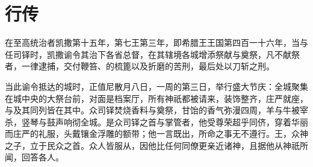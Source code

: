 
\chapter{行传}


\par

在至高统治者凯撒第十五年，第七王第三年，即希腊王王国第四百一十六年，当与任司铎时，凯撒谕令其治下各省总督，在其辖境各城增添祭献与奠祭，凡不献祭者，一律逮捕，交付鞭笞、的梳篦以及折磨的苦刑，最后处以刀斩之刑。\par

当此谕令抵达的城时，正值尼散月八日，一周的第三日，举行盛大节庆：全城聚集在城中央的大祭台前，对面是档案厅，所有神祇都被请来，装饰整齐，庄严就座，与及其同列皆在其中。众司铎焚烧香料与奠祭，甘饴的香气弥漫四周，羊与牛被宰杀，竖琴与鼓声响彻全城。是众司铎之首与掌管者，他受尊荣超乎同侪，穿着华丽而庄严的礼服，头戴镶金浮雕的额带；他一言既出，所命之事无不遵行。王，众神之子，立于民众之首。众人皆服从，因他比任何同僚更亲近诸神，且据他从神祇所闻，回答各人。\par

